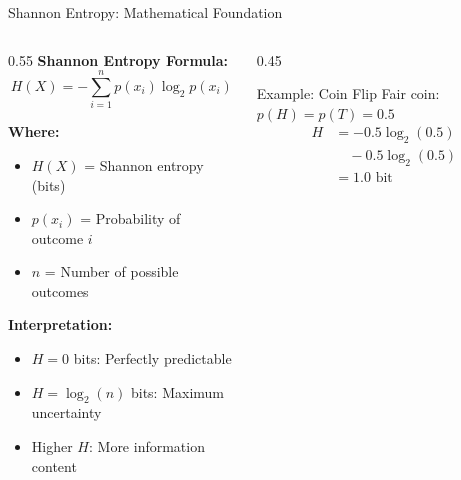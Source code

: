 \documentclass[aspectratio=169,12pt,xcolor=table]{beamer}
\begin{document}
\begin{frame}{Shannon Entropy: Mathematical Foundation}
\begin{columns}[T]
\begin{column}{0.55\textwidth}
    \textbf{Shannon Entropy Formula:}
    \begin{equation*}
        \boxed{H(X) = -\sum_{i=1}^{n} p(x_i) \log_2 p(x_i)}
    \end{equation*}
    
    \vspace{0.1cm}
    \textbf{Where:}
    \begin{itemize}
        \item $H(X)$ = Shannon entropy (bits)
        \item $p(x_i)$ = Probability of outcome $i$
        \item $n$ = Number of possible outcomes
    \end{itemize}
    
    \vspace{0.2cm}
    \textbf{Interpretation:}
    \begin{itemize}
        \item $H = 0$ bits: Perfectly predictable
        \item $H = \log_2(n)$ bits: Maximum uncertainty
        \item Higher $H$: More information content
    \end{itemize}
\end{column}

\begin{column}{0.45\textwidth}
    \begin{block}{Example: Coin Flip}
        Fair coin: $p(H) = p(T) = 0.5$
        \begin{align*}
            H &= -0.5\log_2(0.5) \\
            &\quad - 0.5\log_2(0.5) \\
            &= 1.0 \text{ bit}
        \end{align*}
    \end{block}
    
    \vspace{0.2cm}
\end{column}
\end{columns}
\end{frame}
\end{document}
